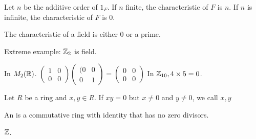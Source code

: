 \documentclass[class=article,crop=false]{standalone}
\begin{document}
\begin{defn}
	Let $ n$ be the additive order of  $ 1_F$. If  $ n$ finite,  the characteristic of $ F$ is  $ n$. If  $ n$ is infinite, the characteristic of  $ F$ is 0.
\end{defn}

\begin{thm}[]
	The characteristic of a field is either 0 or a prime.
\end{thm}
\begin{eg}[]
	Extreme example: $ \mathbb{Z}_2 $ is field. 
\end{eg}
\begin{eg}
	In $ M_2(\mathbb{R})$. $ \begin{pmatrix} 1&0\\0&0 \end{pmatrix} \begin{pmatrix} (0&0\\0&1 \end{pmatrix}  = \begin{pmatrix} 0&0\\0&0 \end{pmatrix} $ 
	In $ \mathbb{Z}_{10}, 4\times 5=0$.
\end{eg}
\begin{defn}
Let $ R$ be a ring and  $ x,y \in R$. If $ xy=0$ but  $ x\neq 0$ and  $ y\neq 0$, we call  $ x,y$   
\end{defn}

\begin{defn}
An  is a commutative ring with identity that has no zero divisors. 
\end{defn}
\begin{eg}[]
$ \mathbb{Z}$.
\end{eg}
\end{document}
